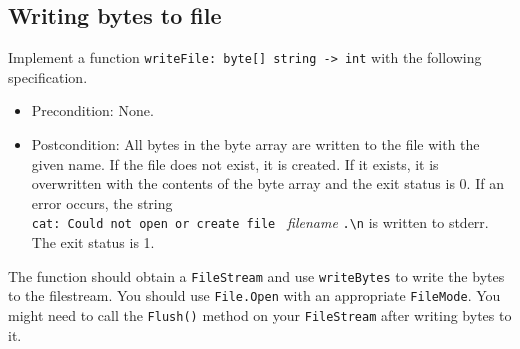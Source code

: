 \subsection*{Writing bytes to file}

Implement a function \texttt{writeFile: byte[] string -> int} with the following specification. 
\begin{itemize}
\item Precondition: None.
\item Postcondition: All bytes in the byte array are written to the file with the given name. If the file does not exist, it is created. If it exists, it is overwritten with the contents of the byte array and the exit status is 0.
  If an error occurs, the string \\ \verb|cat: Could not open or create file | \textit{filename} \verb|.\n| is written to stderr. The exit status is 1.
\end{itemize}

The function should obtain a \texttt{FileStream} and use \texttt{writeBytes} to write the bytes to the filestream. 
You should use \texttt{File.Open} with an appropriate \texttt{FileMode}. 
You might need to call the \texttt{Flush()} method on your \texttt{FileStream} after writing bytes to it. 
